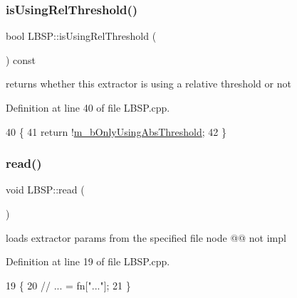 \subsubsection{\texorpdfstring{is\+Using\+Rel\+Threshold()}{isUsingRelThreshold()}}
{\footnotesize\ttfamily bool L\+B\+S\+P\+::is\+Using\+Rel\+Threshold (\begin{DoxyParamCaption}{ }\end{DoxyParamCaption}) const\hspace{0.3cm}{\ttfamily [virtual]}}



returns whether this extractor is using a relative threshold or not 



Definition at line 40 of file L\+B\+S\+P.\+cpp.


\begin{DoxyCode}
40                                      \{
41     \textcolor{keywordflow}{return} !\mbox{\hyperlink{class_l_b_s_p_a5f49537c70502b73f32038218a4f8371}{m\_bOnlyUsingAbsThreshold}};
42 \}
\end{DoxyCode}
\mbox{\label{class_l_b_s_p_abd44c9e34e9a3b10ca1f08e32cc7f2fa}} 
\subsubsection{\texorpdfstring{read()}{read()}}
{\footnotesize\ttfamily void L\+B\+S\+P\+::read (\begin{DoxyParamCaption}\item[{const cv\+::\+File\+Node \&}]{ }\end{DoxyParamCaption})\hspace{0.3cm}{\ttfamily [virtual]}}



loads extractor params from the specified file node @@ not impl 



Definition at line 19 of file L\+B\+S\+P.\+cpp.


\begin{DoxyCode}
19                                    \{
20     \textcolor{comment}{// ... = fn["..."];}
21 \}
\end{DoxyCode}
\mbox{\label{class_l_b_s_p_a555e2f241fbdac2ebb1eab31482f5f05}} 
